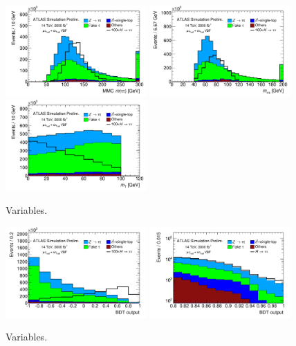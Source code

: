 \begin{figure}[tp]
  \includegraphics[width=0.48\textwidth]{figures/ATL-PHYS-PUB-2014-018/fig_04f}
  \includegraphics[width=0.48\textwidth]{figures/ATL-PHYS-PUB-2014-018/fig_04g}
  \includegraphics[width=0.48\textwidth]{figures/ATL-PHYS-PUB-2014-018/fig_04h}
  \caption{Variables.}
  \label{fig:prospects-hllhc-taus}
\end{figure}

\begin{figure}[tp]
  \centering
  \includegraphics[width=0.48\textwidth]{figures/ATL-PHYS-PUB-2014-018/fig_06a}
  \includegraphics[width=0.48\textwidth]{figures/ATL-PHYS-PUB-2014-018/fig_06b}
  \caption{Variables.}
  \label{fig:prospects-hllhc-bdts}
\end{figure}


